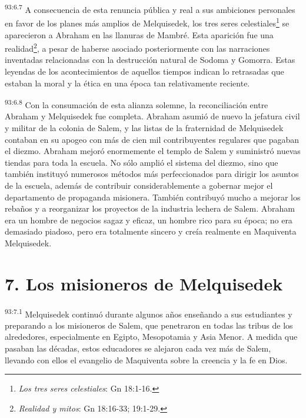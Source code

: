 \par
\textsuperscript{93:6.7} A consecuencia de esta renuncia pública y real a sus ambiciones personales en favor de los planes más amplios de Melquisedek, los tres seres celestiales\footnote{\textit{Los tres seres celestiales}: Gn 18:1-16.} se aparecieron a Abraham en las llanuras de Mambré. Esta aparición fue una realidad\footnote{\textit{Realidad y mitos}: Gn 18:16-33; 19:1-29.}, a pesar de haberse asociado posteriormente con las narraciones inventadas relacionadas con la destrucción natural de Sodoma y Gomorra. Estas leyendas de los acontecimientos de aquellos tiempos indican lo retrasadas que estaban la moral y la ética en una época tan relativamente reciente.

\par
\textsuperscript{93:6.8} Con la consumación de esta alianza solemne, la reconciliación entre Abraham y Melquisedek fue completa. Abraham asumió de nuevo la jefatura civil y militar de la colonia de Salem, y las listas de la fraternidad de Melquisedek contaban en su apogeo con más de cien mil contribuyentes regulares que pagaban el diezmo. Abraham mejoró enormemente el templo de Salem y suministró nuevas tiendas para toda la escuela. No sólo amplió el sistema del diezmo, sino que también instituyó numerosos métodos más perfeccionados para dirigir los asuntos de la escuela, además de contribuir considerablemente a gobernar mejor el departamento de propaganda misionera. También contribuyó mucho a mejorar los rebaños y a reorganizar los proyectos de la industria lechera de Salem. Abraham era un hombre de negocios sagaz y eficaz, un hombre rico para su época; no era demasiado piadoso, pero era totalmente sincero y creía realmente en Maquiventa Melquisedek.

\section*{7. Los misioneros de Melquisedek}
\par
\textsuperscript{93:7.1} Melquisedek continuó durante algunos años enseñando a sus estudiantes y preparando a los misioneros de Salem, que penetraron en todas las tribus de los alrededores, especialmente en Egipto, Mesopotamia y Asia Menor. A medida que pasaban las décadas, estos educadores se alejaron cada vez más de Salem, llevando con ellos el evangelio de Maquiventa sobre la creencia y la fe en Dios.


